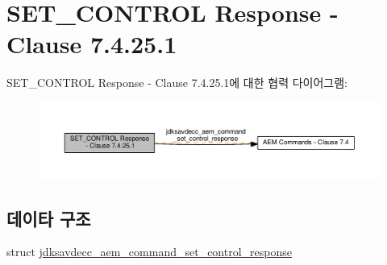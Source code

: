 \hypertarget{group__command__set__control__response}{}\section{S\+E\+T\+\_\+\+C\+O\+N\+T\+R\+OL Response -\/ Clause 7.4.25.1}
\label{group__command__set__control__response}
S\+E\+T\+\_\+\+C\+O\+N\+T\+R\+OL Response -\/ Clause 7.4.25.1에 대한 협력 다이어그램\+:
\nopagebreak
\begin{figure}[H]
\begin{center}
\leavevmode
\includegraphics[width=350pt]{group__command__set__control__response}
\end{center}
\end{figure}
\subsection*{데이타 구조}
\begin{DoxyCompactItemize}
\item 
struct \hyperlink{structjdksavdecc__aem__command__set__control__response}{jdksavdecc\+\_\+aem\+\_\+command\+\_\+set\+\_\+control\+\_\+response}
\end{DoxyCompactItemize}
